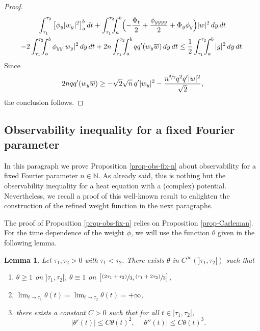 \documentclass[JEP,XML,SOM,Unicode]{cedram}
\newcommand{\psfrac}[2]{\sfrac{(#1)}{#2}}
\theoremstyle{plain}
\newtheorem{lemma}[theorem]{Lemma}
\theoremstyle{definition}
\newcommand{\abs}[1]{\vert #1\vert}
\newcommand{\1}{\mathds 1}
\let\Im\relax
\DeclareMathOperator{\Im}{\mathsf{Im}\mkern2mu}
\newcommand{\N}{\mathbb{N}}
\let\th\theta
\let\vf\phi
\begin{document}
\begin{proof}
\begin{multline*}
\int_{\tau_1}^{\tau_2} \big[ \phi_y \abs{w_y}^2 \big]_a^b \, dt + \int_{\tau_1}^{\tau_2}\hspace*{-2mm} \int_a^b \Bigl(- \frac {\Phi_t}2 + \frac { \phi_{yyyy}}2 + \Phi_y \phi_y \Bigr) \abs w^2 \, dy \, dt \\
- 2 \int_{\tau_1}^{\tau_2}\hspace*{-2mm} \int_a^b \phi_{yy} \abs{w_y}^2 \, dy \, dt + 2n \int_{\tau_1}^{\tau_2}\hspace*{-2mm} \int_a^b qq' \Im(w_y \overline w) \, dy \, dt \leq \frac 12 \int_{\tau_1}^{\tau_2}\hspace*{-2mm} \int_a^b |g|^2 \, dy \, dt.
\end{multline*}
Since
\[
2n qq' \Im(w_y \overline w) \geq - \sqrt 2 \sqrt n\,q' \abs{w_y}^2 - \frac { n^{\sfrac 32} q^2 q' \abs w^2} {\sqrt 2},
\]
the conclusion follows.
\end{proof}

\subsection{Observability inequality for a fixed Fourier parameter} \label{sec-obs-fixed-n}

In this paragraph we prove Proposition \ref{prop-obs-fix-n} about observability for a fixed Fourier parameter $n \in \N$. As already said, this is nothing but the observability inequality for a heat equation with a (complex) potential. Nevertheless, we recall a proof of this well-known result to enlighten the construction of the refined weight function in the next paragraphs.

The proof of Proposition \ref{prop-obs-fix-n} relies on Proposition \ref{prop-Carleman}. For the time dependence of the weight $\vf$, we will use the function $\th$ given in the following lemma.

\begin{lemma} \label{lemma_def_theta}
Let $\tau_1,\tau_2 > 0$ with $\tau_1<\tau_2$. There exists $\theta$ in $C^\infty(]\tau_1,\tau_2[)$ such that
\begin{enumerate}
\item $\theta \geq 1$ on $]\tau_1,\tau_2[$, $\theta \equiv 1$ on $\big[\psfrac{2\tau_1 + \tau_2}{3},\psfrac{\tau_1 + 2\tau_2}{3} \big]$,
\item $\lim_{t \rightarrow \tau_1} \theta(t) = \lim_{t \rightarrow \tau_2} \theta(t)= + \infty$,
\item there exists a constant $C>0$ such that for all $t \in{}]\tau_1,\tau_2[$,
\[
\vert \theta'(t) \vert \leq C \theta(t)^2, \quad \vert \theta''(t) \vert \leq C \theta(t)^3.
\]
\end{enumerate}
\end{lemma}
\end{document}

